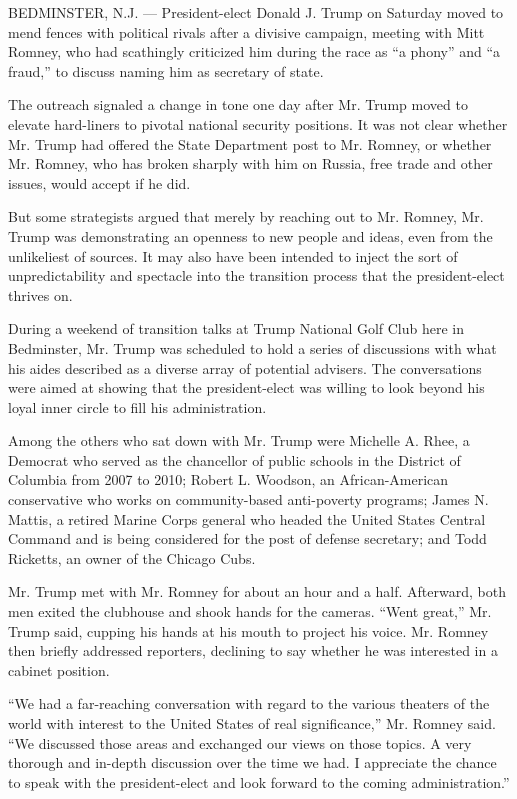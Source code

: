 BEDMINSTER, N.J. --- President-elect Donald J. Trump on Saturday moved
to mend fences with political rivals after a divisive campaign, meeting
with Mitt Romney, who had scathingly criticized him during the race as
``a phony'' and ``a fraud,'' to discuss naming him as secretary of
state.

The outreach signaled a change in tone one day after Mr. Trump moved to
elevate hard-liners to pivotal national security positions. It was not
clear whether Mr. Trump had offered the State Department post to Mr.
Romney, or whether Mr. Romney, who has broken sharply with him on
Russia, free trade and other issues, would accept if he did.

But some strategists argued that merely by reaching out to Mr. Romney,
Mr. Trump was demonstrating an openness to new people and ideas, even
from the unlikeliest of sources. It may also have been intended to
inject the sort of unpredictability and spectacle into the transition
process that the president-elect thrives on.

During a weekend of transition talks at Trump National Golf Club here in
Bedminster, Mr. Trump was scheduled to hold a series of discussions with
what his aides described as a diverse array of potential advisers. The
conversations were aimed at showing that the president-elect was willing
to look beyond his loyal inner circle to fill his administration.

Among the others who sat down with Mr. Trump were Michelle A. Rhee, a
Democrat who served as the chancellor of public schools in the District
of Columbia from 2007 to 2010; Robert L. Woodson, an African-American
conservative who works on community-based anti-poverty programs; James
N. Mattis, a retired Marine Corps general who headed the United States
Central Command and is being considered for the post of defense
secretary; and Todd Ricketts, an owner of the Chicago Cubs.

Mr. Trump met with Mr. Romney for about an hour and a half. Afterward,
both men exited the clubhouse and shook hands for the cameras. ``Went
great,'' Mr. Trump said, cupping his hands at his mouth to project his
voice. Mr. Romney then briefly addressed reporters, declining to say
whether he was interested in a cabinet position.

``We had a far-reaching conversation with regard to the various theaters
of the world with interest to the United States of real significance,''
Mr. Romney said. ``We discussed those areas and exchanged our views on
those topics. A very thorough and in-depth discussion over the time we
had. I appreciate the chance to speak with the president-elect and look
forward to the coming administration.''

